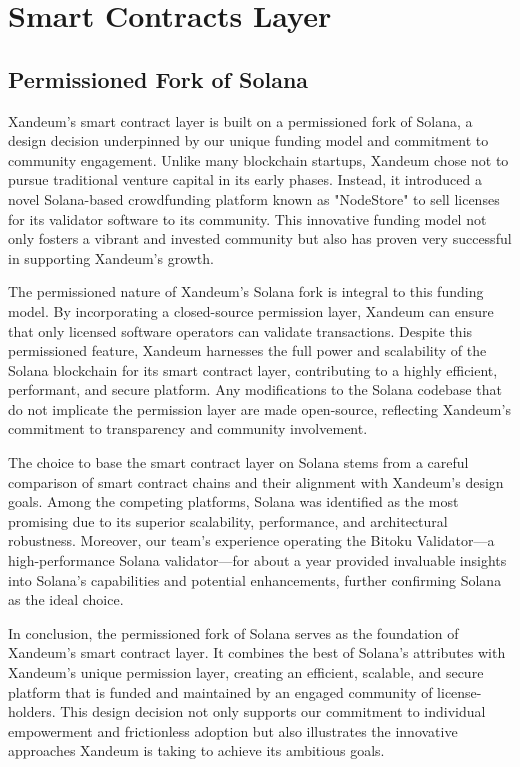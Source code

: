 \documentclass[11pt]{article}   	%
\let\oldsection\section
\renewcommand{\section}{\clearpage\oldsection}
\begin{document}
\section{Smart Contracts Layer}
\subsection{Permissioned Fork of Solana}
Xandeum's smart contract layer is built on a permissioned fork of Solana, a design decision underpinned by our unique funding model and commitment to community engagement. Unlike many blockchain startups, Xandeum chose not to pursue traditional venture capital in its early phases. Instead, it introduced a novel Solana-based crowdfunding platform known as "NodeStore" to sell licenses for its validator software to its community. This innovative funding model not only fosters a vibrant and invested community but also has proven very successful in supporting Xandeum's growth.

The permissioned nature of Xandeum's Solana fork is integral to this funding model. By incorporating a closed-source permission layer, Xandeum can ensure that only licensed software operators can validate transactions. Despite this permissioned feature, Xandeum harnesses the full power and scalability of the Solana blockchain for its smart contract layer, contributing to a highly efficient, performant, and secure platform. Any modifications to the Solana codebase that do not implicate the permission layer are made open-source, reflecting Xandeum's commitment to transparency and community involvement.

The choice to base the smart contract layer on Solana stems from a careful comparison of smart contract chains and their alignment with Xandeum's design goals. Among the competing platforms, Solana was identified as the most promising due to its superior scalability, performance, and architectural robustness. Moreover, our team's experience operating the Bitoku Validator—a high-performance Solana validator—for about a year provided invaluable insights into Solana's capabilities and potential enhancements, further confirming Solana as the ideal choice.

In conclusion, the permissioned fork of Solana serves as the foundation of Xandeum's smart contract layer. It combines the best of Solana's attributes with Xandeum's unique permission layer, creating an efficient, scalable, and secure platform that is funded and maintained by an engaged community of license-holders. This design decision not only supports our commitment to individual empowerment and frictionless adoption but also illustrates the innovative approaches Xandeum is taking to achieve its ambitious goals.
\end{document}

